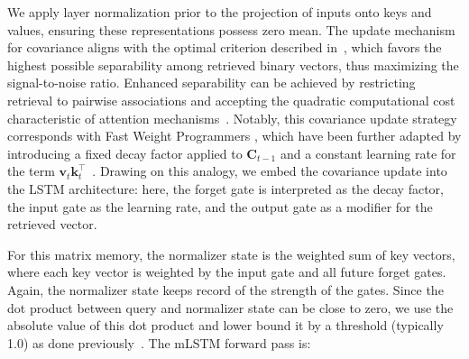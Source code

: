 We apply layer normalization prior to the projection of inputs onto keys and values, ensuring these representations possess zero mean. The update mechanism for covariance aligns with the optimal criterion described in~\citep{Dayan:91}, which favors the highest possible separability among retrieved binary vectors, thus maximizing the signal-to-noise ratio. Enhanced separability can be achieved by restricting retrieval to pairwise associations and accepting the quadratic computational cost characteristic of attention mechanisms~\citep{Krotov:16,Krotov:17,Ramsauer:21}. Notably, this covariance update strategy corresponds with Fast Weight Programmers \citep{Schmidhuber:92ncfastweights,Schlag:21}, which have been further adapted by introducing a fixed decay factor applied to $\mathbf{C}_{t-1}$ and a constant learning rate for the term $\mathbf{v}_{t} \mathbf{k}_t ^\top$~\citep{Ba:16}. Drawing on this analogy, we embed the covariance update into the LSTM architecture: here, the forget gate is interpreted as the decay factor, the input gate as the learning rate, and the output gate as a modifier for the retrieved vector.

For this matrix memory, the normalizer state is the weighted sum of key vectors, where each key vector is weighted by the input gate and all future forget gates. Again, the normalizer state keeps record of the strength of the gates. Since the dot product between query and normalizer state can be close to zero, we use the absolute value of this dot product and lower bound it by a threshold (typically 1.0) as done previously~\citep{Sun:23arxiv}. The mLSTM forward pass is:


